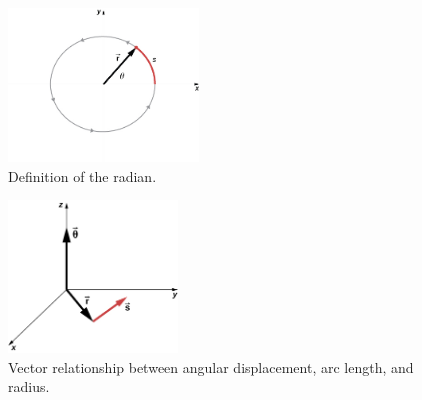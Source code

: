 \documentclass{article}
\begin{document}
\begin{figure}[hb]
\centering
\includegraphics[width=0.45\textwidth]{figures/circle.jpeg}
\caption{\label{fig:1} Definition of the radian.}
\end{figure}

\begin{figure}[hb]
\centering
\includegraphics[width=0.4\textwidth]{figures/circle2.jpeg}
\caption{\label{fig:2} Vector relationship between angular displacement, arc length, and radius.}
\end{figure}
\end{document}
